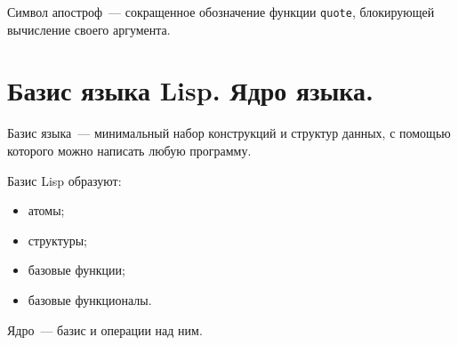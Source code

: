 Символ апостроф~--- сокращенное обозначение функции \texttt{quote}, блокирующей вычисление своего аргумента.

\section{Базис языка Lisp. Ядро языка.}

Базис языка~--- минимальный набор конструкций и структур данных, с помощью которого можно написать любую программу.

Базис Lisp образуют:
\begin{itemize}
	\item атомы;
	\item структуры;
	\item базовые функции;
	\item базовые функционалы.
\end{itemize}

Ядро~--- базис и операции над ним.